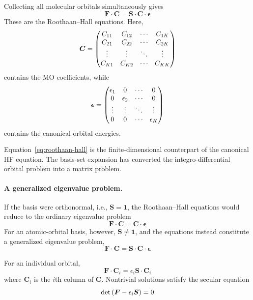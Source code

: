\documentclass[11pt,a4paper,titlepage]{article}
\numberwithin{equation}{section}
\newcommand{\bC}{\boldsymbol{C}}
\newcommand{\bF}{\boldsymbol{F}}
\newcommand{\bI}{\boldsymbol{1}}
\newcommand{\bS}{\boldsymbol{S}}
\newcommand{\beps}{\boldsymbol{\epsilon}}
\begin{document}
Collecting all molecular orbitals simultaneously gives
\begin{equation}
  \boxed{
  \bF\cdot\bC
  =
  \bS\cdot\bC\cdot\beps
  }
  \label{eq:roothaan-hall}
\end{equation}
These are the Roothaan--Hall equations.
Here,
\begin{equation}
  \bC
  =
  \pmqty{
    C_{11}&C_{12}&\cdots&C_{1K}\\
    C_{21}&C_{22}&\cdots&C_{2K}\\
    \vdots&\vdots&\ddots&\vdots\\
    C_{K1}&C_{K2}&\cdots&C_{KK}
  }
\end{equation}
contains the MO coefficients, while
\begin{equation}
  \beps
  =
  \pmqty{
    \epsilon_1&0&\cdots&0\\
    0&\epsilon_2&\cdots&0\\
    \vdots&\vdots&\ddots&\vdots\\
    0&0&\cdots&\epsilon_K
  }
\end{equation}
contains the canonical orbital energies.

Equation~\eqref{eq:roothaan-hall} is the finite-dimensional counterpart of
the canonical HF equation. The basis-set expansion has converted the
integro-differential orbital problem into a matrix problem.


\paragraph{A generalized eigenvalue problem.}

If the basis were orthonormal, i.e., $\bS=\bI$,
the Roothaan--Hall equations would reduce to the ordinary eigenvalue problem
\begin{equation}
  \bF\cdot\bC
  =
  \bC\cdot\beps
\end{equation}
For an atomic-orbital basis, however, $\bS\neq\bI$,
and the equations instead constitute a
generalized eigenvalue problem,
\begin{equation}
  \bF\cdot\bC
  =
  \bS\cdot\bC\cdot\beps
\end{equation}

For an individual orbital,
\begin{equation}
  \bF\cdot\bC_i
  =
  \epsilon_i\bS\cdot\bC_i
\end{equation}
where $\bC_i$ is the $i$th column of $\bC$. Nontrivial solutions satisfy
the secular equation
\begin{equation}
  \det\qty(
    \bF-\epsilon_i\bS
  )
  =
  0
  \label{eq:secular-equation}
\end{equation}
\end{document}

